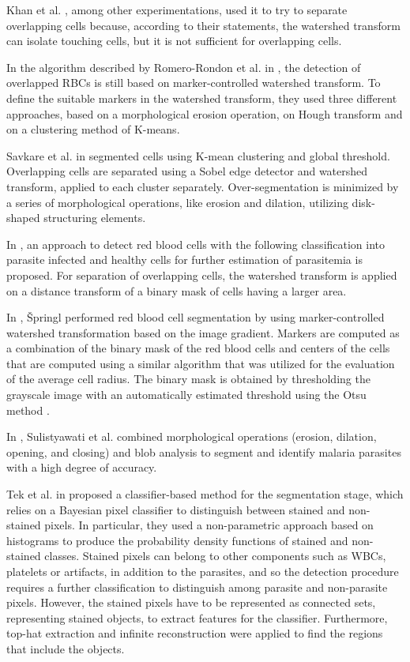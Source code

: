 \documentclass[final,a4paper,12pt,english]{UnicaPhdThesis3}
\begin{document}
Khan et al. \cite{Khan2011}, among other experimentations, used it to try to separate overlapping cells because, according to their statements, the watershed transform can isolate touching cells, but it is not sufficient for overlapping cells.

In the algorithm described by Romero-Rondon et al. in \cite{Romero2016}, the detection of overlapped RBCs is still based on marker-controlled watershed transform. To define the suitable markers in the watershed transform, they used three different approaches, based on a morphological erosion operation, on Hough transform and on a clustering method of K-means.

{Savkare et al. in \cite{Savkare2015} segmented cells using K-mean clustering and global threshold. Overlapping cells are separated using a Sobel edge detector and watershed transform, applied to each cluster separately. Over-segmentation is minimized by a series of morphological operations, like erosion and dilation, utilizing disk-shaped structuring elements.
	
	In \cite{Savkare2011a}, an approach to detect red blood cells with the following classification into parasite infected and healthy cells for further estimation of parasitemia is proposed. For separation of overlapping cells, the watershed transform is applied on a distance transform of a binary mask of cells having a larger area.
	
	In \cite{Springl2009}, {\v{S}}pringl performed red blood cell segmentation by using marker-controlled watershed transformation based on the image gradient. Markers are computed as a combination of the binary mask of the red blood cells and centers of the cells that are computed using a similar algorithm that was utilized for the evaluation of the average cell radius. The binary mask is obtained by thresholding the grayscale image with an automatically estimated threshold using the Otsu method \cite{Otsu}.
	
	In \cite{Sulist2015}, Sulistyawati et al. combined morphological operations (erosion, dilation, opening, and closing) and blob analysis to segment and identify malaria parasites with a high degree of accuracy.
	
	Tek et al. in \cite{Tek2006} proposed a classifier-based method for the segmentation stage, which relies on a Bayesian pixel classifier to distinguish between stained and non-stained pixels. In particular, they used a non-parametric approach based on histograms to produce the probability density functions of stained and non-stained classes. Stained pixels can belong to other components such as WBCs, platelets or artifacts, in addition to the parasites, and so the detection procedure requires a further classification to distinguish among parasite and non-parasite pixels. However, the stained pixels have to be represented as connected sets, representing stained objects, to extract features for the classifier. Furthermore, top-hat extraction and infinite reconstruction were applied to find the regions that include the objects.
	
}
\end{document}
